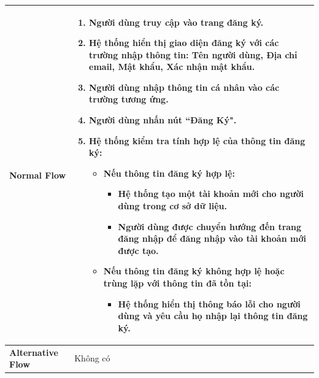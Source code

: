 \begin{longtable}[H]{|l|p{}|}
        \textbf{Normal Flow} & \vspace{-0.75cm} \begin{enumerate}[leftmargin=5.5mm]
            \setlength\itemsep{0em}
            \item Người dùng truy cập vào trang đăng ký.
            \item Hệ thống hiển thị giao diện đăng ký với các trường nhập thông tin: Tên người dùng, Địa chỉ email, Mật khẩu, Xác nhận mật khẩu.
            \item Người dùng nhập thông tin cá nhân vào các trường tương ứng.
            \item Người dùng nhấn nút ``Đăng Ký".
            \item Hệ thống kiểm tra tính hợp lệ của thông tin đăng ký:
                \begin{itemize}
                    \setlength\itemsep{0em}
                    \item Nếu thông tin đăng ký hợp lệ:
                        \begin{itemize}
                            \setlength\itemsep{0em}
                            \item Hệ thống tạo một tài khoản mới cho người dùng trong cơ sở dữ liệu.
                            \item Người dùng được chuyển hướng đến trang đăng nhập để đăng nhập vào tài khoản mới được tạo.
                        \end{itemize}
                    \item Nếu thông tin đăng ký không hợp lệ hoặc trùng lặp với thông tin đã tồn tại:
                        \begin{itemize}
                            \setlength\itemsep{0em}
                            \item Hệ thống hiển thị thông báo lỗi cho người dùng và yêu cầu họ nhập lại thông tin đăng ký.
                        \end{itemize}
                \end{itemize}
        \end{enumerate}\\
            
        \hline
            
        \textbf{Alternative Flow} & Không có \\
            
        \hline 
            

\end{longtable}
